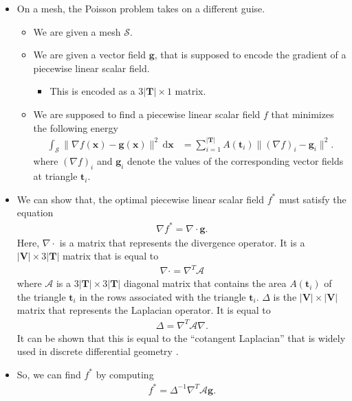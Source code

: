 \documentclass[10pt]{article}
\newcommand{\dee}{\mathrm{d}}
\newcommand{\ve}[1]{\mathbf{#1}}
\newcommand{\mcal}[1]{\mathcal{#1}}
\begin{document}
\begin{itemize}
    \item On a mesh, the Poisson problem takes on a different guise.
    \begin{itemize}
        \item We are given a mesh $\mathcal{S}$.
        \item We are given a vector field $\ve{g}$, that is supposed to encode the gradient of a piecewise linear scalar field.
        \begin{itemize}
            \item This is encoded as a $3|\ve{T}| \times 1$ matrix.            
        \end{itemize}
        \item We are supposed to find a piecewise linear scalar field $f$ that minimizes the following energy
        \begin{align*}
            \int_{\mathcal{S}} \| \nabla f(\ve{x}) - \ve{g}(\ve{x}) \|^2 \, \dee\ve{x}
            &= \sum_{i=1}^{|\ve{T}|} A(\ve{t}_i) \| (\nabla f)_i - \ve{g}_i \|^2.
        \end{align*}
        where $(\nabla f)_i$ and $\ve{g}_i$ denote the values of the corresponding vector fields at triangle $\ve{t}_i$.
    \end{itemize}

    \item We can show that, the optimal piecewise linear scalar field $f^*$ must satisfy the equation
    \begin{align*}
        \nabla f^* = \nabla \cdot \ve{g}.
    \end{align*}
    Here, $\nabla \cdot$ is a matrix that represents the divergence operator. It is a $|\ve{V}| \times 3|\ve{T}|$ matrix that is equal to
    \begin{align*}
        \nabla \cdot = \nabla^T \mcal{A}
    \end{align*}
    where $\mcal{A}$ is a $3|\ve{T}| \times 3|\ve{T}|$ diagonal matrix that contains the area $A(\ve{t}_i)$ of the triangle $\ve{t}_i$ in the rows associated with the triangle $\ve{t}_i$. $\Delta$ is the $|\ve{V}| \times |\ve{V}|$ matrix that represents the Laplacian operator. It is equal to
    \begin{align*}
        \Delta = \nabla^T \mcal{A} \nabla.
    \end{align*}
    It can be shown that this is equal to the ``cotangent Laplacian'' that is widely used in discrete differential geometry \cite{Crane:DdgCourse:2025}.

    \item So, we can find $f^*$ by computing
    \begin{align*}
        f^* = \Delta^{-1} \nabla^T \mcal{A}\ve{g}.
    \end{align*}
    

\end{itemize}
\end{document}
